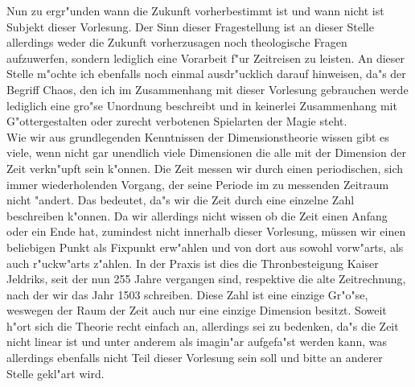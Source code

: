 \documentclass[a5paper,8pt]{book}
\begin{document}
Nun zu ergr"unden wann die Zukunft vorherbestimmt ist und wann nicht ist Subjekt dieser Vorlesung. Der Sinn dieser Fragestellung ist an dieser Stelle allerdings weder 
die Zukunft vorherzusagen noch theologische Fragen aufzuwerfen, sondern lediglich eine Vorarbeit f"ur Zeitreisen zu leisten. An dieser Stelle m"ochte ich ebenfalls 
noch einmal ausdr"ucklich darauf hinweisen, da"s der Begriff Chaos, den ich im Zusammenhang mit dieser Vorlesung gebrauchen werde lediglich eine gro"se Unordnung 
beschreibt und in keinerlei Zusammenhang mit G"ottergestalten oder zurecht verbotenen Spielarten der Magie steht.\\

Wie wir aus grundlegenden Kenntnissen der Dimensionstheorie wissen gibt es viele, wenn nicht gar unendlich viele Dimensionen die alle mit der Dimension der Zeit verkn"upft 
sein k"onnen. Die Zeit messen wir durch einen periodischen, sich immer wiederholenden Vorgang, der seine Periode im zu messenden Zeitraum nicht "andert. Das bedeutet, da"s 
wir die Zeit durch eine einzelne Zahl beschreiben k"onnen. Da wir allerdings nicht wissen ob die Zeit einen Anfang oder ein Ende hat, zumindest nicht innerhalb dieser 
Vorlesung, müssen wir einen beliebigen Punkt als Fixpunkt erw"ahlen und von dort aus sowohl vorw"arts, als auch r"uckw"arts z"ahlen. In der Praxis ist dies die 
Thronbesteigung Kaiser Jeldriks, seit der nun 255 Jahre vergangen sind, respektive die alte Zeitrechnung, nach der wir das Jahr 1503 schreiben. Diese Zahl ist eine einzige 
Gr"o"se, weswegen der Raum der Zeit auch nur eine einzige Dimension besitzt. Soweit h"ort sich die Theorie recht einfach an, allerdings sei zu bedenken, da"s die Zeit nicht 
linear 
ist und unter anderem als imagin"ar aufgefa"st werden kann, was allerdings ebenfalls nicht Teil dieser Vorlesung sein soll und bitte an anderer Stelle gekl"art wird.\\
\end{document}
